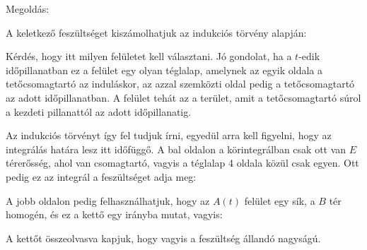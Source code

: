 
\ifdefined\megoldas

 Megoldás:

 A keletkező feszültséget kiszámolhatjuk az indukciós törvény alapján:

 Kérdés, hogy itt milyen felületet kell választani. Jó gondolat, ha a $t$-edik időpillanatban ez a felület egy olyan téglalap, amelynek az egyik oldala a tetőcsomagtartó az induláskor, az azzal szemközti oldal pedig a tetőcsomagtartó az adott időpillanatban. A felület tehát az a terület, amit a tetőcsomagtartó súrol a kezdeti pillanattól az adott időpillanatig. 


 Az indukciós törvényt így fel tudjuk írni, egyedül arra kell figyelni, hogy az integrálás határa lesz itt időfüggő. A bal oldalon a körintegrálban csak ott van $E$ térerősség, ahol van csomagtartó, vagyis a téglalap 4 oldala közül csak egyen. Ott pedig ez az integrál a feszültséget adja meg:

 A jobb oldalon pedig felhasználhatjuk, hogy az $A(t)$ felület egy sík, a $B$ tér homogén, és ez a kettő egy irányba mutat, vagyis:

 A kettőt összeolvasva kapjuk, hogy
 vagyis a feszültség állandó nagyságú.
 
\fi